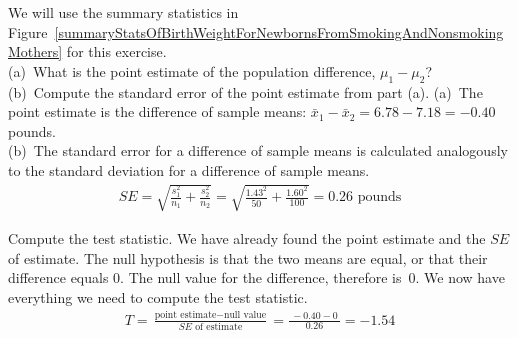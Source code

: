 \begin{examplewrap}
\begin{nexample}
{We will use the summary statistics in Figure~\ref{summaryStatsOfBirthWeightForNewbornsFromSmokingAndNonsmokingMothers} for this exercise.
\\ (a)~What is the point estimate of the population difference, $\mu_{1} - \mu_{2}$? 
\\(b)~Compute the standard error of the point estimate from part (a).}
(a)~The point estimate is the difference of sample means: $\bar{x}_{1} - \bar{x}_{2} = 6.78-7.18=-0.40$ pounds. \\
(b)~The standard error for a difference of sample means is calculated analogously to the standard deviation for a difference of sample means.
\begin{eqnarray*}
SE = \sqrt{\frac{s_1^2}{n_1} + \frac{s_2^2}{n_2}}
	= \sqrt{\frac{1.43^2}{50} + \frac{1.60^2}{100}}
	= 0.26 \text{ pounds}
\end{eqnarray*}
\end{nexample}
\end{examplewrap}


\begin{examplewrap}
\begin{nexample}{Compute the test statistic. } \label{babySmokeHTForWeightComputePValueAndEvalHT}
We have already found the point estimate and the $SE$ of estimate.  The null hypothesis is that the two means are equal, or that their difference equals 0.  The null value for the difference, therefore is~0.  We now have everything we need to compute the test statistic.
\begin{eqnarray*}
T = \frac{\text{point estimate} - \text{null value}}{SE \text{ of estimate}} = \frac{\ -0.40 - 0\ }{0.26} = -1.54
\end{eqnarray*}
\end{nexample}
\end{examplewrap}

